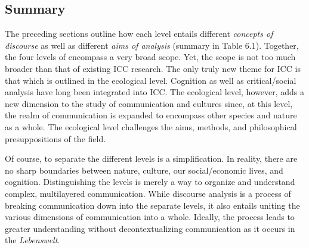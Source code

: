\subsection{Summary}

The preceding sections outline how each level entails different \textit{concepts of discourse} as well as different \textit{aims of analysis} (summary in Table 6.1). Together, the four levels of encompass a very broad scope. Yet, the scope is not too much broader than that of existing ICC research. The only truly new theme for ICC is that which is outlined in the ecological level. Cognition as well as critical/social analysis have long been integrated into ICC. The ecological level, however, adds a new dimension to the study of communication and cultures since, at this level, the realm of communication is expanded to encompass other species and nature as a whole. The ecological level challenges the aims, methods, and philosophical presuppositions of the field.

Of course, to separate the different levels is a simplification. In reality, there are no sharp boundaries between nature, culture, our social/economic lives, and cognition. Distinguishing the levels is merely a way to organize and understand complex, multilayered communication. While discourse analysis is a process of breaking communication down into the separate levels, it also entails uniting the various dimensions of communication into a whole. Ideally, the process leads to greater understanding without decontextualizing communication as it occurs in the \textit{Lebenswelt}.

